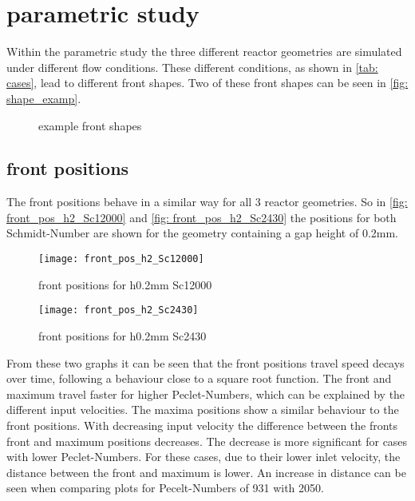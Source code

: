 \documentclass[../thesis.tex]{subfiles}
\begin{document}
\chapter{parametric study}
\label{chp: para_stud}
Within the parametric study the three different reactor geometries are simulated under different flow conditions. These different conditions, as shown in \autoref{tab: cases}, lead to different front shapes. Two of these front shapes can be seen in \autoref{fig: shape_examp}.
\begin{figure}[htb]
	\centering
	\qquad
	\caption{example front shapes}%
	\label{fig: shape_examp}%
\end{figure}

\section{front positions}

The front positions behave in a similar way for all 3 reactor geometries. So in \autoref{fig: front_pos_h2_Sc12000} and \autoref{fig: front_pos_h2_Sc2430} the positions for both Schmidt-Number are shown for the geometry containing a gap height of 0.2mm.
\begin{figure}[htbp]
	\centering
	\texttt{[image: front\_pos\_h2\_Sc12000]}
	\caption{front positions for h0.2mm Sc12000\label{fig: front_pos_h2_Sc12000}}\bigskip
	\texttt{[image: front\_pos\_h2\_Sc2430]}
	\caption{front positions for h0.2mm Sc2430\label{fig: front_pos_h2_Sc2430}}
\end{figure}

From these two graphs it can be seen that the front positions travel speed decays over time, following a behaviour close to a  square root function. The front and maximum travel faster for higher Peclet-Numbers, which can be explained by the different input velocities. The maxima positions show a similar behaviour to the front positions. 
With decreasing input velocity the difference between the fronts front and maximum positions decreases. The decrease is more significant for cases with lower Peclet-Numbers. For these cases, due to their lower inlet velocity, the distance between the front and maximum is lower. An increase in distance can be seen when comparing plots for Pecelt-Numbers of 931 with 2050.
\end{document}
